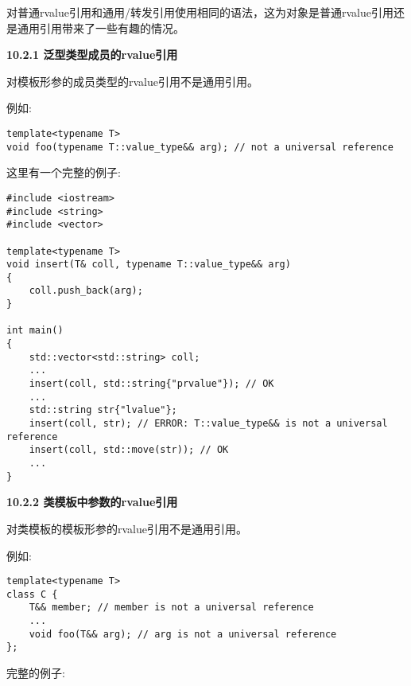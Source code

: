 对普通rvalue引用和通用/转发引用使用相同的语法，这为对象是普通rvalue引用还是通用引用带来了一些有趣的情况。\par

\hspace*{\fill} \par %
\textbf{10.2.1 泛型类型成员的rvalue引用}

对模板形参的成员类型的rvalue引用不是通用引用。\par

例如:\par

\begin{lstlisting}[caption={}]
template<typename T>
void foo(typename T::value_type&& arg); // not a universal reference
\end{lstlisting}

这里有一个完整的例子:\par

{\color{red}{generic/universalmem.cpp}}\par

\begin{lstlisting}[caption={}]
#include <iostream>
#include <string>
#include <vector>

template<typename T>
void insert(T& coll, typename T::value_type&& arg)
{
	coll.push_back(arg);
}

int main()
{
	std::vector<std::string> coll;
	...
	insert(coll, std::string{"prvalue"}); // OK
	...
	std::string str{"lvalue"};
	insert(coll, str); // ERROR: T::value_type&& is not a universal reference
	insert(coll, std::move(str)); // OK
	...
}
\end{lstlisting}

\hspace*{\fill} \par %
\textbf{10.2.2 类模板中参数的rvalue引用}

对类模板的模板形参的rvalue引用不是通用引用。\par

例如:\par

\begin{lstlisting}[caption={}]
template<typename T>
class C {
	T&& member; // member is not a universal reference
	...
	void foo(T&& arg); // arg is not a universal reference
};
\end{lstlisting}

完整的例子:\par

{\color{red}{generic/universalclass.cpp}}\par

